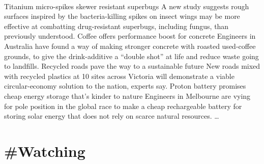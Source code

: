 \documentclass[10pt,a4paper]{article}
\begin{document}
\begin{multicols}{2}
\paragraph{}
Titanium micro-spikes skewer resistant superbugs
A new study suggests rough surfaces inspired by the bacteria-killing spikes on insect wings may be more effective at combatting drug-resistant superbugs, including fungus, than previously understood.
Coffee offers performance boost for concrete
Engineers in Australia have found a way of making stronger concrete with roasted used-coffee grounds, to give the drink-additive a “double shot” at life and reduce waste going to landfills.
Recycled roads pave the way to a sustainable future
New roads mixed with recycled plastics at 10 sites across Victoria will demonstrate a viable circular-economy solution to the nation, experts say.
Proton battery promises cheap energy storage that’s kinder to nature
Engineers in Melbourne are vying for pole position in the global race to make a cheap rechargeable battery for storing solar energy that does not rely on scarce natural resources.
\dots\par
\end{multicols}

\newpage
\section{\#Watching}
\end{document}
